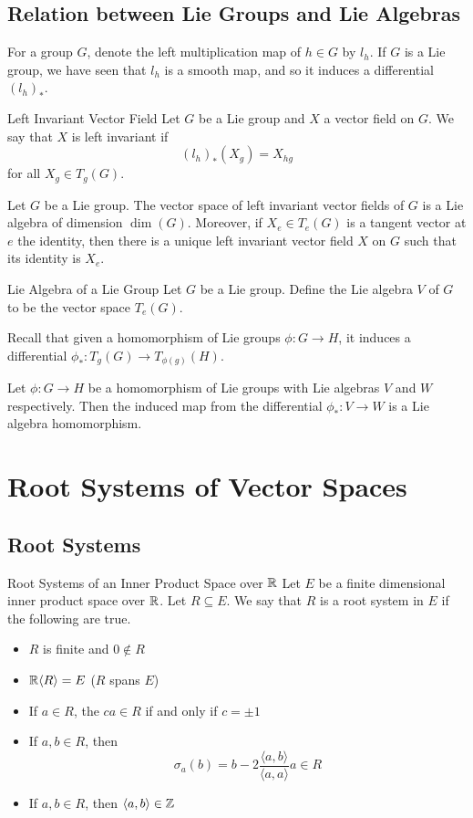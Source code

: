 \documentclass[a4paper]{article}
\begin{document}
\subsection{Relation between Lie Groups and Lie Algebras}
For a group $G$, denote the left multiplication map of $h\in G$ by $l_h$. If $G$ is a Lie group, we have seen that $l_h$ is a smooth map, and so it induces a differential $(l_h)_\ast$. 

\begin{defn}{Left Invariant Vector Field}{} Let $G$ be a Lie group and $X$ a vector field on $G$. We say that $X$ is left invariant if $$(l_h)_\ast(X_g)=X_{hg}$$ for all $X_g\in T_g(G)$. 
\end{defn}

\begin{prp}{}{} Let $G$ be a Lie group. The vector space of left invariant vector fields of $G$ is a Lie algebra of dimension $\dim(G)$. Moreover, if $X_e\in T_e(G)$ is a tangent vector at $e$ the identity, then there is a unique left invariant vector field $X$ on $G$ such that its identity is $X_e$. 
\end{prp}

\begin{defn}{Lie Algebra of a Lie Group}{} Let $G$ be a Lie group. Define the Lie algebra $V$ of $G$ to be the vector space $T_e(G)$. 
\end{defn}

Recall that given a homomorphism of Lie groups $\phi:G\to H$, it induces a differential $\phi_\ast:T_g(G)\to T_{\phi(g)}(H)$. 

\begin{prp}{}{} Let $\phi:G\to H$ be a homomorphism of Lie groups with Lie algebras $V$ and $W$ respectively. Then the induced map from the differential $\phi_\ast:V\to W$ is a Lie algebra homomorphism. 
\end{prp}

\pagebreak
\section{Root Systems of Vector Spaces}
\subsection{Root Systems}
\begin{defn}{Root Systems of an Inner Product Space over $\mathbb{R}$}{} Let $E$ be a finite dimensional inner product space over $\mathbb{R}$. Let $R\subseteq E$. We say that $R$ is a root system in $E$ if the following are true. 
\begin{itemize}
\item $R$ is finite and $0\notin R$
\item $\mathbb{R}\langle R\rangle=E$ ($R$ spans $E$)
\item If $a\in R$, the $ca\in R$ if and only if $c=\pm1$
\item If $a,b\in R$, then $$\sigma_a(b)=b-2\frac{\langle a,b\rangle}{\langle a,a\rangle}a\in R$$
\item If $a,b\in R$, then $\langle a,b\rangle\in\mathbb{Z}$
\end{itemize}
\end{defn}
\end{document}
